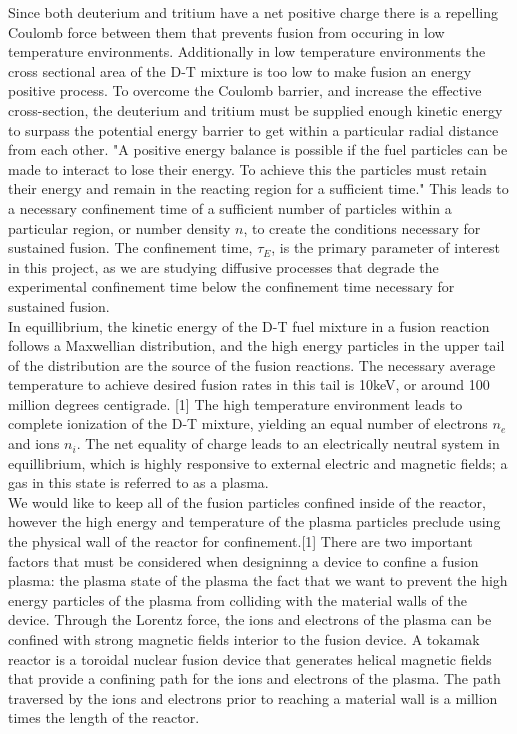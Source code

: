 \documentclass{article}
\begin{document}
Since both deuterium and tritium have a net positive charge there is a repelling Coulomb force between them that prevents fusion from occuring in low temperature environments. Additionally in low temperature environments the cross sectional area of the D-T mixture is too low to make fusion an energy positive process. To overcome the Coulomb barrier, and increase the effective cross-section, the deuterium and tritium must be supplied enough kinetic energy to surpass the potential energy barrier to get within a particular radial distance from each other. "A positive energy balance is possible if the fuel particles can be made to interact to lose their energy. To achieve this the particles must retain their energy and remain in the reacting region for a sufficient time." This leads to a necessary confinement time of a sufficient number of particles within a particular region, or number density $n$, to create the conditions necessary for sustained fusion. The confinement time, $\tau_E$, is the primary parameter of interest in this project, as we are studying diffusive processes that degrade the experimental confinement time below the confinement time necessary for sustained fusion.\\
 In equillibrium, the kinetic energy of the D-T fuel mixture in a fusion reaction follows a Maxwellian distribution, and the high energy particles in the upper tail of the distribution are the source of the fusion reactions. The necessary average temperature to achieve desired fusion rates in this tail is 10keV, or around 100 million degrees centigrade. [1] The high temperature environment leads to complete ionization of the D-T mixture, yielding an equal number of electrons $n_e$ and ions $n_i$. The net equality of charge leads to an electrically neutral system in equillibrium, which is highly responsive to external electric and magnetic fields; a gas in this state is referred to as a plasma.\\
We would like to keep all of the fusion particles confined inside of the reactor, however the high energy and temperature of the plasma particles preclude using the physical wall of the reactor for confinement.[1] There are two important factors that must be considered when designinng a device to confine a fusion plasma: the plasma state of the plasma the fact that we want to prevent the high energy particles of the plasma from colliding with the material walls of the device. Through the Lorentz force, the ions and electrons of the plasma can be confined with strong magnetic fields interior to the fusion device. A tokamak reactor is a toroidal nuclear fusion device that generates helical magnetic fields that provide a confining path for the ions and electrons of the plasma. The path traversed by the ions and electrons prior to reaching a material wall is a million times the length of the reactor.\\
\newline
\end{document}
